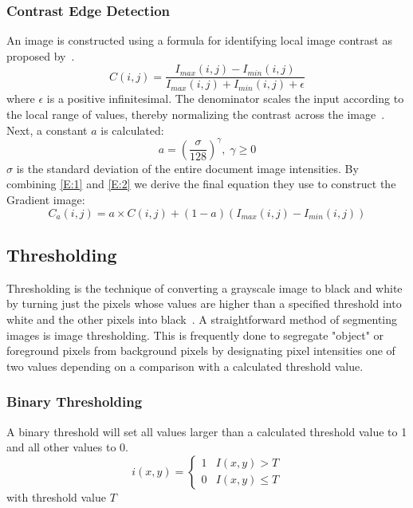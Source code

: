 \documentclass[a4paper, 12pt]{report}
\begin{document}
\subsubsection{Contrast Edge Detection}
An image is constructed using a formula for identifying local image contrast as proposed by~\cite{su2012robust}.
\begin{equation}
    \label{E:1}
    C(i,j)=\frac{I_{max}(i,j)-I_{min}(i,j)}{I_{max}(i,j)+I_{min}(i,j)+\epsilon}
\end{equation}
where \(\epsilon\) is a positive infinitesimal. The denominator scales the input according to the local range of values, thereby normalizing the contrast across the image~\cite{su2012robust}. Next, a constant \(a\) is calculated:
\begin{equation}
    \label{E:2}
    a=(\frac{\sigma}{128})^\gamma, \; \gamma \geq 0
\end{equation}
\(\sigma\) is the standard deviation of the entire document image intensities.
By combining \ref{E:1} and \ref{E:2} we derive the final equation they use to construct the Gradient image:
\begin{equation}
    \label{E:3}
    C_a(i,j)=a\times C(i,j)+(1-a)(I_{max}(i,j)-I_{min}(i,j))
\end{equation}

\subsection{Thresholding}
Thresholding is the technique of converting a grayscale image to black and white by turning just the pixels whose values are higher than a specified threshold into white and the other pixels into black~\cite{inproceedings}. A straightforward method of segmenting images is image thresholding. This is frequently done to segregate "object" or foreground pixels from background pixels by designating pixel intensities one of two values depending on a comparison with a calculated threshold value.

\subsubsection{Binary Thresholding}
A binary threshold will set all values larger than a calculated threshold value to 1 and all other values to 0.
\[
    i(x,y)=
    \begin{cases}
        1 & I(x,y) > T    \\
        0 & I(x,y) \leq T
    \end{cases}
\]
with threshold value $T$
\end{document}

